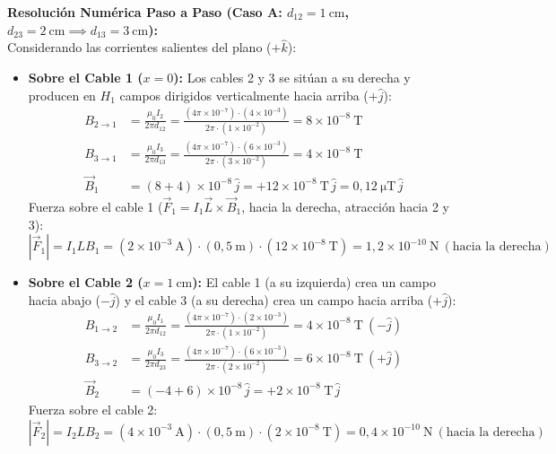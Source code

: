 \begin{ejercicio}
\textbf{Resolución Numérica Paso a Paso (Caso A: $d_{12} = 1\ \si{\centi\meter}$, $d_{23} = 2\ \si{\centi\meter} \implies d_{13} = 3\ \si{\centi\meter}$):}\\[4pt]
Considerando las corrientes salientes del plano ($+\hat{k}$):
\begin{itemize}[leftmargin=*]
    \item \textbf{Sobre el Cable 1 ($x = 0$):} Los cables 2 y 3 se sitúan a su derecha y producen en $H_1$ campos dirigidos verticalmente hacia arriba ($+\hat{j}$):
    \begin{align}
        B_{2 \to 1} &= \frac{\mu_0 I_2}{2\pi d_{12}} = \frac{(4\pi \times 10^{-7}) \cdot (4 \times 10^{-3})}{2\pi \cdot (1 \times 10^{-2})} = 8 \times 10^{-8}\ \si{\tesla} \\
        B_{3 \to 1} &= \frac{\mu_0 I_3}{2\pi d_{13}} = \frac{(4\pi \times 10^{-7}) \cdot (6 \times 10^{-3})}{2\pi \cdot (3 \times 10^{-2})} = 4 \times 10^{-8}\ \si{\tesla} \\
        \vec{B}_1 &= (8 + 4) \times 10^{-8}\,\hat{j} = +12 \times 10^{-8}\ \si{\tesla}\,\hat{j} = 0{,}12\ \si{\micro\tesla}\,\hat{j}
    \end{align}
    Fuerza sobre el cable 1 ($\vec{F}_1 = I_1 \vec{L} \times \vec{B}_1$, hacia la derecha, atracción hacia 2 y 3):
    \begin{equation}
        |\vec{F}_1| = I_1 L B_1 = (2 \times 10^{-3}\ \si{\ampere}) \cdot (0{,}5\ \si{\meter}) \cdot (12 \times 10^{-8}\ \si{\tesla}) = 1{,}2 \times 10^{-10}\ \si{\newton}\ (\text{hacia la derecha})
    \end{equation}

    \item \textbf{Sobre el Cable 2 ($x = 1\ \si{\centi\meter}$):} El cable 1 (a su izquierda) crea un campo hacia abajo ($-\hat{j}$) y el cable 3 (a su derecha) crea un campo hacia arriba ($+\hat{j}$):
    \begin{align}
        B_{1 \to 2} &= \frac{\mu_0 I_1}{2\pi d_{12}} = \frac{(4\pi \times 10^{-7}) \cdot (2 \times 10^{-3})}{2\pi \cdot (1 \times 10^{-2})} = 4 \times 10^{-8}\ \si{\tesla}\ (-\hat{j}) \\
        B_{3 \to 2} &= \frac{\mu_0 I_3}{2\pi d_{23}} = \frac{(4\pi \times 10^{-7}) \cdot (6 \times 10^{-3})}{2\pi \cdot (2 \times 10^{-2})} = 6 \times 10^{-8}\ \si{\tesla}\ (+\hat{j}) \\
        \vec{B}_2 &= (-4 + 6) \times 10^{-8}\,\hat{j} = +2 \times 10^{-8}\ \si{\tesla}\,\hat{j}
    \end{align}
    Fuerza sobre el cable 2:
    \begin{equation}
        |\vec{F}_2| = I_2 L B_2 = (4 \times 10^{-3}\ \si{\ampere}) \cdot (0{,}5\ \si{\meter}) \cdot (2 \times 10^{-8}\ \si{\tesla}) = 0{,}4 \times 10^{-10}\ \si{\newton}\ (\text{hacia la derecha})
    \end{equation}


\end{itemize}
\end{ejercicio}
